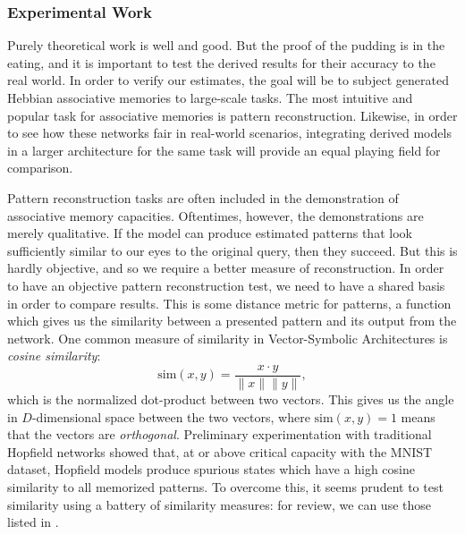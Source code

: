 \documentclass{article}
\theoremstyle{definition}
\begin{document}
\subsubsection{Experimental Work}

Purely theoretical work is well and good. But the proof of the
pudding is in the eating,
and it is important to test the derived results for their accuracy to
the real world.
In order to verify our estimates, the goal will be to subject generated Hebbian
associative memories to large-scale tasks. The most intuitive and popular
task for associative memories is pattern reconstruction. Likewise, in order
to see how these networks fair in real-world scenarios, integrating
derived models in a larger architecture for the same task will provide
an equal playing field for comparison.

Pattern reconstruction tasks are often included in the demonstration of
associative memory capacities. Oftentimes, however, the demonstrations
are merely qualitative. If the model can produce estimated patterns that
look sufficiently similar to our eyes to the original query, then they succeed.
But this is hardly objective, and so we require a better measure of
reconstruction.
In order to have an objective pattern reconstruction test, we need to
have a shared basis in order to compare results. This is some
distance metric for patterns, a function which gives us the similarity
between a presented pattern and its output from the network. One common
measure of similarity in Vector-Symbolic Architectures 
\parencites{smolensky_tensor_1990,plate_holographic_1995,gayler_multiplicative_1998}
is \textit{cosine similarity}:
\begin{equation}
  \text{sim}(x, y) = \frac{x \cdot y}{\|x \| \|y \|},
\end{equation}
which is the normalized dot-product between two vectors. This gives us the 
angle in $D$-dimensional space between the two vectors, where $\text{sim}(x, y) = 1$
means that the vectors are \textit{orthogonal}. Preliminary experimentation
with traditional Hopfield networks showed that, at or above critical capacity
with the MNIST dataset, Hopfield models produce spurious states which have
a high cosine similarity to all memorized patterns.
To overcome this, it seems prudent to test similarity using a battery of 
similarity measures: for review, we can use those listed in 
\textcite{kelly_memory_2017}. 

\end{document}
